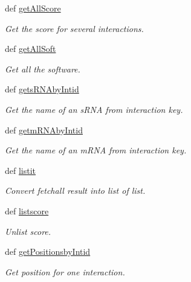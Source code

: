 \begin{DoxyCompactItemize}
def \hyperlink{classirna_1_1iRNA__stat_1_1Sqlite__manager_1_1Sqlite__manager_ab71e446ad65fda9f6c84c9352dc1687b}{get\-All\-Score}
\begin{DoxyCompactList}\small\item\em \-Get the score for several interactions. \end{DoxyCompactList}\item 
def \hyperlink{classirna_1_1iRNA__stat_1_1Sqlite__manager_1_1Sqlite__manager_adae12ea9c6b019c5248a41f0d06bdc2a}{get\-All\-Soft}
\begin{DoxyCompactList}\small\item\em \-Get all the software. \end{DoxyCompactList}\item 
def \hyperlink{classirna_1_1iRNA__stat_1_1Sqlite__manager_1_1Sqlite__manager_a52b38901f840d3cf462af70d110930a8}{gets\-R\-N\-Aby\-Intid}
\begin{DoxyCompactList}\small\item\em \-Get the name of an s\-R\-N\-A from interaction key. \end{DoxyCompactList}\item 
def \hyperlink{classirna_1_1iRNA__stat_1_1Sqlite__manager_1_1Sqlite__manager_a79bc07c024c274a40603af0eec3acdf1}{getm\-R\-N\-Aby\-Intid}
\begin{DoxyCompactList}\small\item\em \-Get the name of an m\-R\-N\-A from interaction key. \end{DoxyCompactList}\item 
def \hyperlink{classirna_1_1iRNA__stat_1_1Sqlite__manager_1_1Sqlite__manager_ac18dabc972fdf53fa39fe61667e9948d}{listit}
\begin{DoxyCompactList}\small\item\em \-Convert fetchall result into list of list. \end{DoxyCompactList}\item 
def \hyperlink{classirna_1_1iRNA__stat_1_1Sqlite__manager_1_1Sqlite__manager_ad5014bd3458fb8a433aed9e7e2a4c1bd}{listscore}
\begin{DoxyCompactList}\small\item\em \-Unlist score. \end{DoxyCompactList}\item 
def \hyperlink{classirna_1_1iRNA__stat_1_1Sqlite__manager_1_1Sqlite__manager_a9341408edc6fabd6d81c7a225b1b1d0e}{get\-Positionsby\-Intid}
\begin{DoxyCompactList}\small\item\em \-Get position for one interaction. \end{DoxyCompactList}\item 

\end{DoxyCompactItemize}
